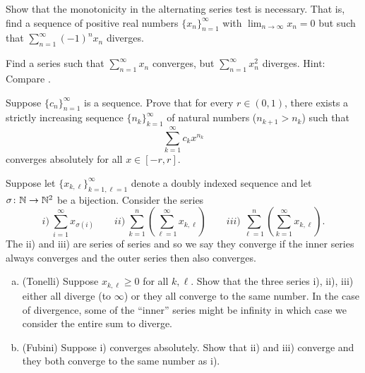 \begin{exercise}[Challenging]
Show that the monotonicity in the alternating series test
is necessary.  That is, find a sequence of positive real numbers
$\{ x_n \}_{n=1}^\infty$ with $\lim_{n\to\infty} x_n = 0$ but such that
$\sum_{n=1}^\infty {(-1)}^n x_n$ diverges.
\end{exercise}

\begin{exercise}
Find a series such that $\sum_{n=1}^\infty x_n$ converges,
but $\sum_{n=1}^\infty x_n^2$ diverges.
Hint: Compare .
\end{exercise}

\begin{exercise}
Suppose $\{ c_n \}_{n=1}^\infty$ is a sequence.  Prove that for every $r \in (0,1)$,
there exists a strictly increasing sequence $\{ n_k \}_{k=1}^\infty$ of natural numbers
($n_{k+1} > n_k$) such that
\begin{equation*}
\sum_{k=1}^\infty c_k x^{n_k}
\end{equation*}
converges absolutely for all $x \in [-r,r]$.
\end{exercise}

\begin{exercise} \label{exercise:tonellifubiniforsums}
Suppose let $\{ x_{k,\ell} \}_{k=1,\ell=1}^\infty$ denote a doubly
indexed sequence and let $\sigma \colon {\mathbb{N}} \to {\mathbb{N}}^2$ be a bijection.
Consider the series
\begin{equation*}
i)~\sum_{i=1}^\infty x_{\sigma(i)}
\qquad
ii)~\sum_{k=1}^n \left( \sum_{\ell=1}^\infty x_{k,\ell} \right)
\qquad
iii)~\sum_{\ell=1}^n \left( \sum_{k=1}^\infty x_{k,\ell} \right) .
\end{equation*}
The ii) and iii) are series of series and so we say they converge
if the inner series always converges and the outer series then also
converges.
\begin{enumerate}[a)]
\item
(Tonelli) Suppose $x_{k,\ell} \geq 0$ for all $k,\ell$.
Show that the three series i), ii), iii) either all diverge (to $\infty$)
or they all converge to the same number.
In the case of divergence, some of the ``inner'' series might be infinity
in which case we consider the entire sum to diverge.
\item
(Fubini) Suppose i) converges absolutely.  Show that ii) and iii)
converge and they both converge to the same number as i).
\end{enumerate}
\end{exercise}

